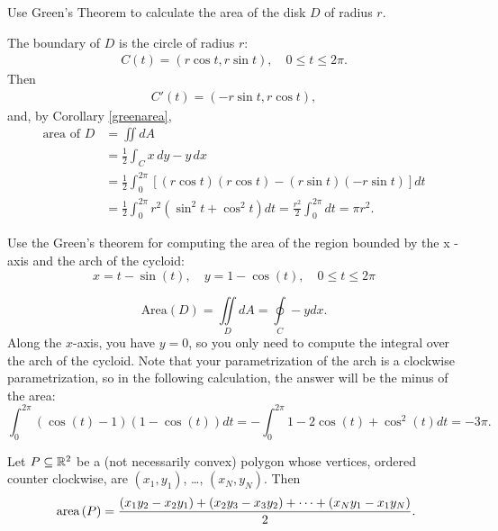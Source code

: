   
\begin{exa}
 Use Green's Theorem to calculate the area of the disk $D$ of radius $r$.

\end{exa}


\begin{solu}
The boundary of $D$ is the circle of radius $r$:
\begin{align*}
  C(t) = (r\cos t, r\sin t), \quad 0 \le t \le 2\pi.
\end{align*}
Then
\begin{align*}
  C'(t) = (-r\sin t, r\cos t),
\end{align*}
and, by Corollary \ref{greenarea},
\begin{align*}
  \text{area of } D &= \iint dA\\
  &=  \frac{1}{2} \int_C x\,dy - y\,dx\\
  &= \frac{1}{2} \int_0^{2\pi} [(r\cos t)(r\cos t) - (r\sin t)(-r\sin t)]dt
  \\
  &=
  \frac{1}{2}  \int_0^{2\pi} r^2 (\sin^2t+\cos^2t) dt = \frac{r^2}{2}\int_0^{2\pi}
  dt
  = \pi r^2.
\end{align*}
  
\end{solu}
  
  

\begin{exa}
Use the  Green's theorem for computing the area of the region bounded by the x -axis and the arch of the cycloid:
\[    x=t-\sin(t), \quad y=1-\cos(t), \quad 0\leq t\leq 2\pi\]
\end{exa}

\begin{solu}
$$ \text{Area}(D) = \iint\limits_D dA =  \oint\limits_C-ydx. $$
Along the $x$-axis, you have $y = 0$, so you only need to compute the integral over the arch of the cycloid. Note that your parametrization of the arch is a clockwise parametrization, so in the following calculation, the answer will be the minus of the area:
$$\int_0^{2\pi} (\cos(t) - 1)(1 - \cos(t)) dt = - \int_0^{2\pi} 1 - 2\cos(t) + \cos^2(t) dt = -3\pi. $$
\end{solu}




  
  
  \begin{corollary}
    Let $P \subseteq \mathbb{R}^2$ be a (not necessarily convex) polygon whose vertices, ordered counter clockwise,
    are $(x_1, y_1)$, \dots, $(x_N, y_N)$.
    Then
    $$
      \area{P} = \dfrac{(x_1 y_2 - x_2 y_1) + (x_2 y_3 - x_3 y_2) + \cdots + (x_N y_1 - x_1 y_N)}{2}.
    $$
  \end{corollary}
  
